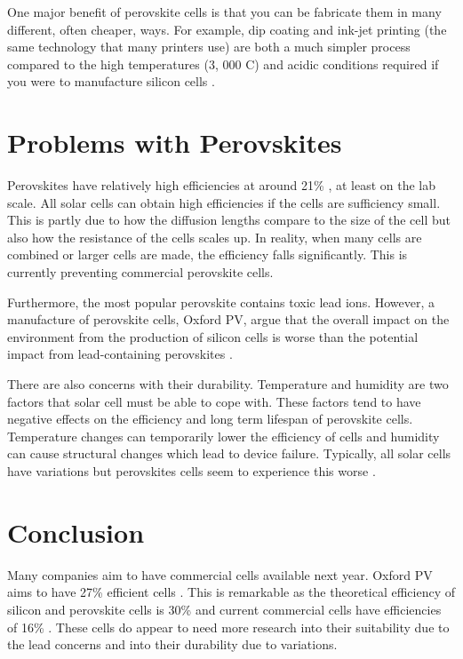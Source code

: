 \documentclass{physics_article_B}
\begin{document}
One major benefit of perovskite cells is that you can be fabricate them in many different, often cheaper, ways. For example, dip coating and ink-jet printing (the same technology that many printers use) are both a much simpler process compared to the high temperatures (3, 000 \degree C) and acidic conditions required if you were to manufacture silicon cells \cite{saliba_cesium-containing_2016}.

\section*{Problems with Perovskites}
Perovskites have relatively high efficiencies at around 21\% \cite{extance_reality_2019}, at least on the lab scale. All solar cells can obtain high efficiencies if the cells are sufficiency small. This is partly due to how the diffusion lengths compare to the size of the cell but also how the resistance of the cells scales up. In reality, when many cells are combined or larger cells are made, the efficiency falls significantly. This is currently preventing commercial perovskite cells.

Furthermore, the most popular perovskite  contains toxic lead ions. However, a manufacture of perovskite cells, Oxford PV, argue that the overall impact on the environment from the production of silicon cells is worse than the potential impact from lead-containing perovskites \cite{extance_reality_2019}.

There are also concerns with their durability. Temperature and humidity are two factors that solar cell must be able to cope with. These factors tend to have negative effects on the efficiency and long term lifespan of perovskite cells. Temperature changes can temporarily lower the efficiency of cells and humidity can cause structural changes which lead to device failure. Typically, all solar cells have variations but perovskites cells seem to experience this worse \cite{extance_reality_2019}.

\section*{Conclusion}
Many companies aim to have commercial cells available next year. Oxford PV aims to have 27\% efficient cells \cite{extance_reality_2019}. This is remarkable as the theoretical efficiency of silicon and perovskite cells is 30\% and current commercial cells have efficiencies of 16\% \cite{extance_reality_2019}. These cells do appear to need more research into their suitability due to the lead concerns and into their durability due to variations.


\printbibliography
\end{document}
